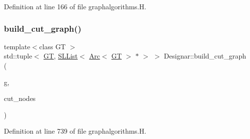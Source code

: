 Definition at line 166 of file graphalgorithms.\+H.

\mbox{\label{namespace_designar_a552f77707068bde5a4449192a1105012}} 
\subsubsection{\texorpdfstring{build\+\_\+cut\+\_\+graph()}{build\_cut\_graph()}}
{\footnotesize\ttfamily template$<$class GT $>$ \\
std\+::tuple$<$ \hyperlink{demo-buildgraph_8_c_a3001c40d2c31ca87ed96cd7d1334a55e}{GT}, \hyperlink{class_designar_1_1_s_l_list}{S\+L\+List}$<$ \hyperlink{namespace_designar_a3f55fb5513d62ff47cbc8f72b8e95d6f}{Arc}$<$ \hyperlink{demo-buildgraph_8_c_a3001c40d2c31ca87ed96cd7d1334a55e}{GT} $>$ $\ast$ $>$ $>$ Designar\+::build\+\_\+cut\+\_\+graph (\begin{DoxyParamCaption}\item[{\hyperlink{demo-buildgraph_8_c_a3001c40d2c31ca87ed96cd7d1334a55e}{GT} \&}]{g,  }\item[{const \hyperlink{class_designar_1_1_s_l_list}{S\+L\+List}$<$ \hyperlink{namespace_designar_a5af326c65aa2bd26b26c410f2030d09e}{Node}$<$ \hyperlink{demo-buildgraph_8_c_a3001c40d2c31ca87ed96cd7d1334a55e}{GT} $>$ $\ast$$>$ \&}]{cut\+\_\+nodes }\end{DoxyParamCaption})}



Definition at line 739 of file graphalgorithms.\+H.

\mbox{\label{namespace_designar_aecd027238b87a5b24792ea3ccd0c44b1}} 
